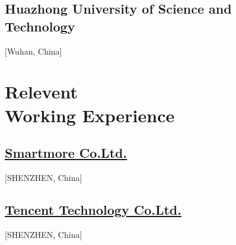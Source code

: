 \documentclass{mycv}
\begin{document}
\subsection{Huazhong University of Science and Technology}[Wuhan, China]
\begin{positions}
\end{positions}
\vspace{-\parskip}%

\section{Relevent \\ Working Experience}

\subsection{\href{https://www.smartmore.com/}{Smartmore Co.Ltd.}}[SHENZHEN, China]
\begin{positions}
\end{positions}



\subsection{\href{https://www.tencent.com/en-us}{Tencent Technology Co.Ltd.}}[SHENZHEN, China]
\begin{positions}
\end{positions}

\end{document}

